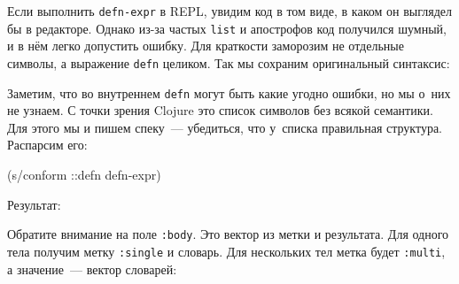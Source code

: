 Если выполнить \verb|defn-expr| в REPL, увидим код в том виде, в каком он
выглядел бы в редакторе. Однако из-за частых \verb|list| и апострофов код
получился шумный, и в нём легко допустить ошибку. Для краткости заморозим не
отдельные символы, а выражение \verb|defn| целиком. Так мы сохраним оригинальный
синтаксис:

\begin{english}
\end{english}

Заметим, что во внутреннем \verb|defn| могут быть какие угодно ошибки, но мы
о~них не узнаем. С точки зрения Clojure это список символов без всякой
семантики. Для этого мы и пишем спеку~--- убедиться, что у~списка правильная
структура. Распарсим его:

\begin{english}
  \begin{clojure}
(s/conform ::defn defn-expr)
  \end{clojure}
\end{english}

\noindent
Результат:

\ifx\DEVICETYPE\MOBILE

\begin{english}
\end{english}

\else

\begin{english}
\end{english}

\fi

Обратите внимание на поле \verb|:body|. Это вектор из метки и результата. Для
одного тела получим метку \verb|:single| и словарь. Для нескольких тел метка
будет \verb|:multi|, а значение~--- вектор словарей:

